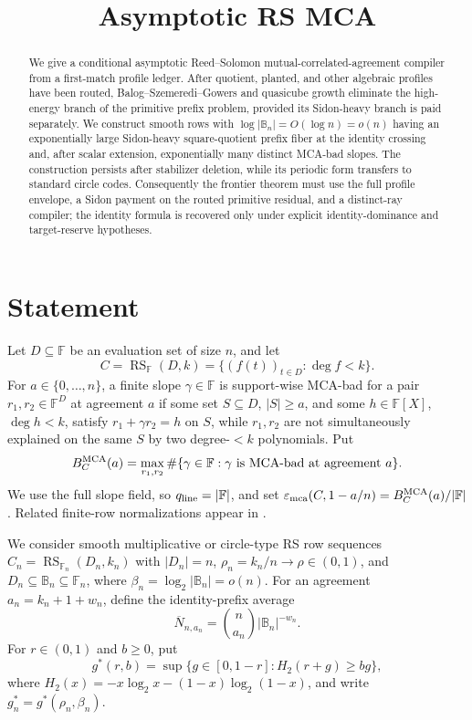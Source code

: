 \documentclass[11pt,a4paper]{amsart}
\title{Asymptotic RS MCA}
\date{}
\numberwithin{equation}{section}
\theoremstyle{remark}
\DeclareMathOperator{\RS}{RS}
\newcommand{\F}{\mathbb F}
\newcommand{\B}{\mathbb B}
\newcommand{\barN}{\overline N}
\newcommand{\eps}{\varepsilon}
\begin{document}
\begin{abstract}
We give a conditional asymptotic Reed--Solomon mutual-correlated-agreement compiler from a first-match profile ledger.  After quotient, planted, and other algebraic profiles have been routed, Balog--Szemeredi--Gowers and quasicube growth eliminate the high-energy branch of the primitive prefix problem, provided its Sidon-heavy branch is paid separately.  We construct smooth rows with \(\log|\B_n|=O(\log n)=o(n)\) having an exponentially large Sidon-heavy square-quotient prefix fiber at the identity crossing and, after scalar extension, exponentially many distinct MCA-bad slopes.  The construction persists after stabilizer deletion, while its periodic form transfers to standard circle codes.  Consequently the frontier theorem must use the full profile envelope, a Sidon payment on the routed primitive residual, and a distinct-ray compiler; the identity formula is recovered only under explicit identity-dominance and target-reserve hypotheses.
\end{abstract}

\maketitle

\section{Statement}

Let \(D\subseteq \F\) be an evaluation set of size \(n\), and let
\[
        C=\RS_{\F}(D,k)=\{(f(t))_{t\in D}:\deg f<k\}.
\]
For \(a\in\{0,\ldots,n\}\), a finite slope \(\gamma\in\F\) is support-wise MCA-bad for a pair \(r_1,r_2\in\F^D\) at agreement \(a\) if some set \(S\subseteq D\), \(|S|\ge a\), and some \(h\in\F[X]\), \(\deg h<k\), satisfy \(r_1+\gamma r_2=h\) on \(S\), while \(r_1,r_2\) are not simultaneously explained on the same \(S\) by two degree-\(<k\) polynomials.  Put
\[
        B_C^{\rm MCA}(a)
        =\max_{r_1,r_2}\#\{\gamma\in\F:\gamma\text{ is MCA-bad at agreement }a\}.
\]
We use the full slope field, so \(q_{\rm line}=|\F|\), and set
\(\eps_{\rm mca}(C,1-a/n)=B_C^{\rm MCA}(a)/|\F|\).  Related finite-row
normalizations appear in \cite{Cho26CapV13,Cho26Grande}.

We consider smooth multiplicative or circle-type RS row sequences
\(C_n=\RS_{\F_n}(D_n,k_n)\) with \(|D_n|=n\),
\(\rho_n=k_n/n\to\rho\in(0,1)\), and
\(D_n\subseteq\B_n\subseteq\F_n\), where
\(\beta_n=\log_2|\B_n|=o(n)\).  For an agreement
\(a_n=k_n+1+w_n\), define the identity-prefix average
\[
        \barN_{n,a_n}=\binom n{a_n}|\B_n|^{-w_n}.
\]
For \(r\in(0,1)\) and \(b\ge0\), put
\[
        g^*(r,b)=\sup\{g\in[0,1-r]:H_2(r+g)\ge bg\},
\]
where \(H_2(x)=-x\log_2x-(1-x)\log_2(1-x)\), and write
\(g_n^*=g^*(\rho_n,\beta_n)\).
\end{document}
